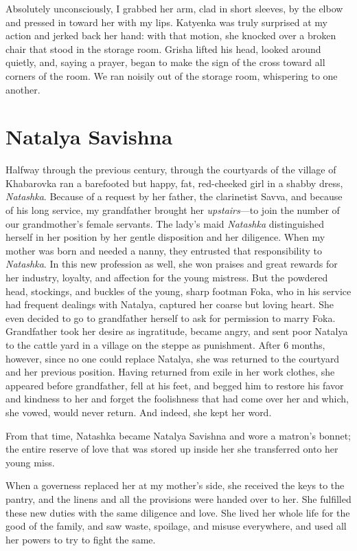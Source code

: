 Absolutely unconsciously, I grabbed her arm, clad in short sleeves, by the elbow and pressed in toward her with my lips. Katyenka was truly surprised at my action and jerked back her hand: with that motion, she knocked over a broken chair that stood in the storage room. Grisha lifted his head, looked around quietly, and, saying a prayer, began to make the sign of the cross toward all corners of the room. We ran noisily out of the storage room, whispering to one another.

\chapter{Natalya Savishna} %

Halfway through the previous century, through the courtyards of the village of Khabarovka ran a barefooted but happy, fat, red-cheeked girl in a shabby dress, \textit{Natashka}. Because of a request by her father, the clarinetist Savva, and because of his long service, my grandfather brought her \emph{upstairs}---to join the number of our grandmother's female servants. The lady's maid \textit{Natashka} distinguished herself in her position by her gentle disposition and her diligence. When my mother was born and needed a nanny, they entrusted that responsibility to \textit{Natashka}. In this new profession as well, she won praises and great rewards for her industry, loyalty, and affection for the young mistress. But the powdered head, stockings, and buckles of the young, sharp footman Foka, who in his service had frequent dealings with Natalya, captured her coarse but loving heart. She even decided to go to grandfather herself to ask for permission to marry Foka. Grandfather took her desire as ingratitude, became angry, and sent poor Natalya to the cattle yard in a village on the steppe as punishment. After 6 months, however, since no one could replace Natalya, she was returned to the courtyard and her previous position. Having returned from exile in her work clothes, she appeared before grandfather, fell at his feet, and begged him to restore his favor and kindness to her and forget the foolishness that had come over her and which, she vowed, would never return. And indeed, she kept her word.

From that time, Natashka became Natalya Savishna and wore a matron's bonnet; the entire reserve of love that was stored up inside her she transferred onto her young miss.

When a governess replaced her at my mother's side, she received the keys to the pantry, and the linens and all the provisions were handed over to her. She fulfilled these new duties with the same diligence and love. She lived her whole life for the good of the family, and saw waste, spoilage, and misuse everywhere, and used all her powers to try to fight the same.

